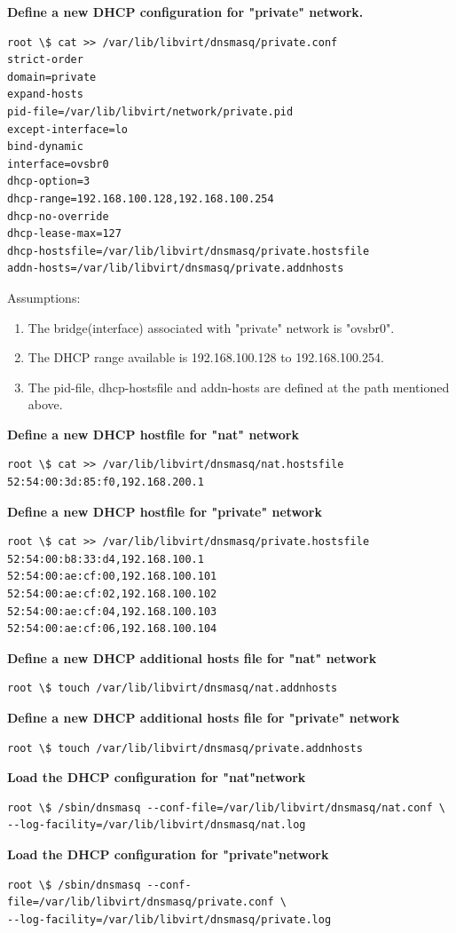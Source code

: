 \documentclass[12pt]{extarticle}
\begin{document}
\begin{enumerate}
\noindent
\textbf{Define a new DHCP configuration for "private" network.}
\begin{verbatim}
root \$ cat >> /var/lib/libvirt/dnsmasq/private.conf
strict-order
domain=private
expand-hosts
pid-file=/var/lib/libvirt/network/private.pid
except-interface=lo
bind-dynamic
interface=ovsbr0
dhcp-option=3
dhcp-range=192.168.100.128,192.168.100.254
dhcp-no-override
dhcp-lease-max=127
dhcp-hostsfile=/var/lib/libvirt/dnsmasq/private.hostsfile
addn-hosts=/var/lib/libvirt/dnsmasq/private.addnhosts
\end{verbatim}
Assumptions:
\begin{enumerate}
\item The bridge(interface) associated with "private" network is "ovsbr0".
\item The DHCP range available is 192.168.100.128 to 192.168.100.254.
\item The pid-file, dhcp-hostsfile and addn-hosts are defined at the path mentioned above.
\end{enumerate}

\noindent
\textbf{Define a new DHCP hostfile for "nat" network}
\begin{verbatim}
root \$ cat >> /var/lib/libvirt/dnsmasq/nat.hostsfile
52:54:00:3d:85:f0,192.168.200.1
\end{verbatim}

\noindent
\textbf{Define a new DHCP hostfile for "private" network}
\begin{verbatim}
root \$ cat >> /var/lib/libvirt/dnsmasq/private.hostsfile
52:54:00:b8:33:d4,192.168.100.1
52:54:00:ae:cf:00,192.168.100.101
52:54:00:ae:cf:02,192.168.100.102
52:54:00:ae:cf:04,192.168.100.103
52:54:00:ae:cf:06,192.168.100.104
\end{verbatim}

\noindent
\textbf{Define a new DHCP additional hosts file for "nat" network}
\begin{verbatim}
root \$ touch /var/lib/libvirt/dnsmasq/nat.addnhosts
\end{verbatim}

\noindent
\textbf{Define a new DHCP additional hosts file for "private" network}
\begin{verbatim}
root \$ touch /var/lib/libvirt/dnsmasq/private.addnhosts
\end{verbatim}


\noindent
\textbf{Load the DHCP configuration for "nat"network}
\begin{verbatim}
root \$ /sbin/dnsmasq --conf-file=/var/lib/libvirt/dnsmasq/nat.conf \
--log-facility=/var/lib/libvirt/dnsmasq/nat.log
\end{verbatim}

\noindent
\textbf{Load the DHCP configuration for "private"network}
\begin{verbatim}
root \$ /sbin/dnsmasq --conf-file=/var/lib/libvirt/dnsmasq/private.conf \
--log-facility=/var/lib/libvirt/dnsmasq/private.log
\end{verbatim}

\end{enumerate}
\end{document}
